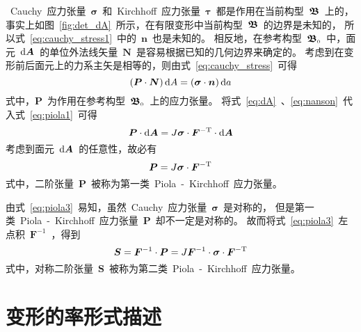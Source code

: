 ~Cauchy~应力张量~$\bm{\sigma}$~和~Kirchhoff~应力张量~$\bm{\tau}$~都是作用在当前构型~$\bm{\mathfrak{B}}$~上的，
事实上如图~\ref{fig:det_dA}~所示，在有限变形中当前构型~$\bm{\mathfrak{B}}$~的边界是未知的，
所以式~\eqref{eq:cauchy_stress1}~中的~$\bm{n}$~也是未知的。
相反地，在参考构型~$\bm{\mathfrak{B}}_{\scriptscriptstyle 0}$~中，面元~$\mathop{}\!\mathrm{d} \bm{A}$~的单位外法线矢量~$\bm{N}$~是容易根据已知的几何边界来确定的。
考虑到在变形前后面元上的力系主矢是相等的，则由式~\eqref{eq:cauchy_stress}~可得
\begin{equation}\label{eq:piola1}
	(\bm{P} \cdot \bm{N})\mathop{}\!\mathrm{d} A=(\bm{\sigma} \cdot \bm{n})\mathop{}\!\mathrm{d} a
\end{equation}
式中，$\bm{P}$~为作用在参考构型~$\bm{\mathfrak{B}}_{\scriptscriptstyle 0}$~上的应力张量。
将式~\eqref{eq:dA}~、\eqref{eq:nanson}~代入式~\eqref{eq:piola1}~可得
\begin{equation}\label{eq:piola2}
	\bm{P} \cdot \mathop{}\!\mathrm{d} \bm{A}=J \bm{\sigma} \cdot \bm{F}^{-\mathrm{T}} \cdot \mathop{}\!\mathrm{d} \bm{A}
\end{equation}
考虑到面元~$\mathop{}\!\mathrm{d} \bm{A}$~的任意性，故必有
\begin{equation}\label{eq:piola3}
	\bm{P}=J \bm{\sigma} \cdot \bm{F}^{-\mathrm{T}}
\end{equation}
式中，二阶张量~$\bm{P}$~被称为第一类~Piola~-~Kirchhoff~应力张量。

由式~\eqref{eq:piola3}~易知，虽然~Cauchy~应力张量~$\bm{\sigma}$~是对称的，
但是第一类~Piola~-~Kirchhoff~应力张量~$\bm{P}$~却不一定是对称的。
故而将式~\eqref{eq:piola3}~左点积~$\bm{F}^{-1}$~，得到
\begin{equation}\label{eq:piola4}
	\bm{S}=\bm{F}^{-1} \cdot \bm{P}=J \bm{F}^{-1} \cdot \bm{\sigma} \cdot \bm{F}^{-\mathrm{T}}
\end{equation}
式中，对称二阶张量~$\bm{S}$~被称为第二类~Piola~-~Kirchhoff~应力张量。

\section{变形的率形式描述}
